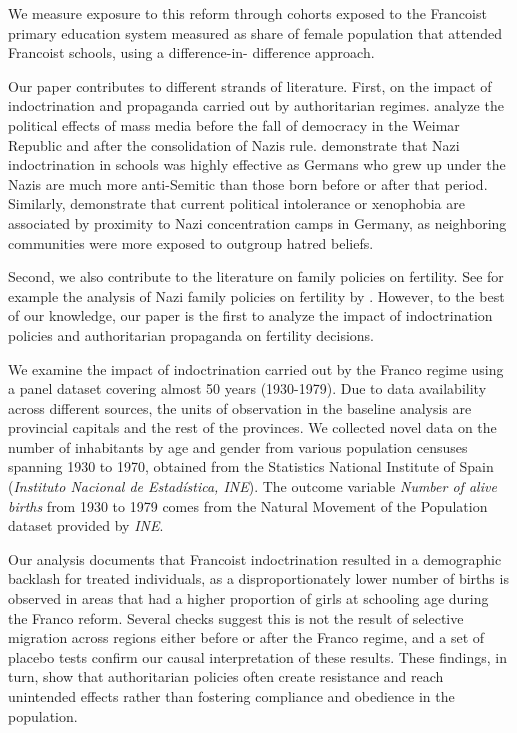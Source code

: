 \documentclass[a4paper,oneside,final,onecolumn,11pt,english]{article}
\begin{document}
We measure exposure to this reform through cohorts exposed to the Francoist primary education system measured as share of female population that attended Francoist schools, using a difference-in- difference approach.  

Our paper contributes to different strands of literature. First, on the impact of indoctrination and propaganda carried out by authoritarian regimes. \citet{adena2015} analyze the political effects of mass media before the fall of democracy in the Weimar Republic and after the consolidation of Nazis rule. \citet{voigtlander2015} demonstrate that Nazi indoctrination in schools was highly effective as Germans who grew up under the Nazis are much more anti-Semitic than those born before or after that period. Similarly, \citet{homola} demonstrate that current political intolerance or xenophobia are associated by proximity to Nazi concentration camps in Germany, as neighboring communities were more exposed to outgroup hatred beliefs.

Second, we also contribute to the literature on family policies on fertility. See for example the analysis of Nazi family policies on fertility by \citet[][]{baudin2023}. However, to the best of our knowledge, our paper is the first to analyze the impact of indoctrination policies and authoritarian propaganda on fertility decisions.

We examine the impact of indoctrination carried out by the Franco regime using a panel dataset covering almost 50 years (1930-1979). Due to data availability across different sources, the units of observation in the baseline analysis are provincial capitals and the rest of the provinces. 
We collected novel data on the number of inhabitants by age and gender from various population censuses spanning 1930 to 1970, obtained from the Statistics National Institute of Spain (\textit{Instituto Nacional de Estad\'istica, INE}). The outcome variable \textit{Number of alive births } from 1930 to 1979 comes from the Natural Movement of the Population dataset provided by \textit{INE}.

Our analysis documents that Francoist indoctrination resulted in a demographic backlash for treated individuals, as a disproportionately lower number of births is observed in areas that had a higher proportion of girls at schooling age during the Franco reform. Several checks suggest this is not the result of selective migration across regions either before or after the Franco regime, and a set of placebo tests confirm our causal interpretation of these results. These findings, in turn, show that authoritarian policies often create resistance and reach unintended effects rather than fostering compliance and obedience in the population.
\end{document}
